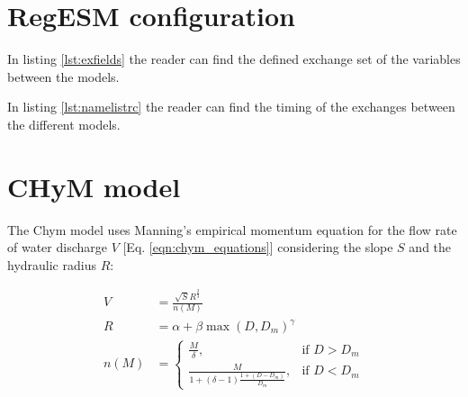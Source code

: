 \documentclass[journal abbreviation, manuscript]{copernicus}
\begin{document}





\appendix
\section{RegESM configuration}
\label{appendix:regesm}
In listing \ref{lst:exfields} the reader can find the defined exchange
set of the variables between the models.



In listing \ref{lst:namelistrc} the reader can find the timing of the
exchanges between the different models.



\section{CHyM model}
\label{appendix:chym}

The Chym model uses Manning's empirical momentum equation \citep{manning-1891}
for the flow rate of water discharge $V$ [Eq. \ref{eqn:chym_equations}]
considering the slope $S$ and the hydraulic radius $R$:

\begin{align}
    \label{eqn:chym_equations}
    V &= \frac{\sqrt{S} R^{\frac{2}{3}}}{n(M)} \\
    R &= \alpha + \beta \max(D,D_{m})^{\gamma} \\
    n(M) &= \begin{cases}
      \frac{M}{\delta}, & \text{if } D > D_{m} \\
      \frac{M}{1+(\delta-1) \frac{1+(D-D_{m})}{D_{m}}}, & \text{if } D < D_{m}
    \end{cases}
\end{align}
\end{document}
